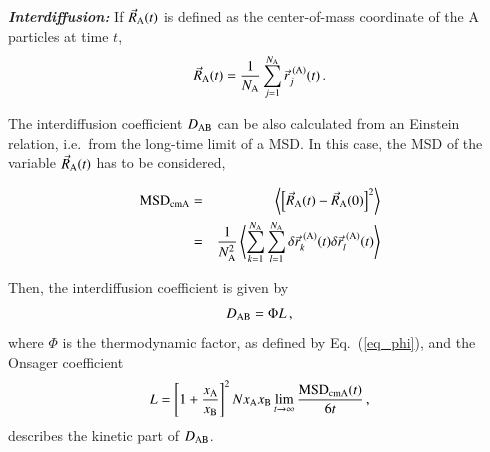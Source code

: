     {\bf \em Interdiffusion:} If $\vec{R}_{\rm A}(t)$ is defined as the center-of-mass coordinate of the A particles at time $t$,
    \begin{equation}
    { \vec{R}_{\rm A}(t) = \frac{1}{N_{\rm A}} \sum_{j=1}^{N_{\rm A}} \vec{r}_j^{\rm \; (A)}(t)} \, .
    \end{equation}

    The interdiffusion coefficient $D_{\rm AB}$ can be also calculated from an Einstein relation, i.e.~from the long-time limit of a MSD. In this case, the MSD of the variable $\vec{R}_{\rm A}(t)$ has to be considered,

    \begin{eqnarray}
    {\rm MSD}_{\rm cmA} 
    & = & \left\langle \left[ \vec{R}_{\rm A}(t) - \vec{R}_{\rm A}(0) \right]^2 \right\rangle \nonumber \\
    & = & \frac{1}{N_{\rm A}^2} \left\langle \sum_{k = 1}^{N_{\rm A}} \sum_{l = 1}^{N_{\rm A}} \delta \vec{r}_k^{\rm \; (A)}(t) \delta \vec{r}_l^{\rm \; (A)}(t) \right\rangle 
    \label{eq_msdcm}
    \end{eqnarray}

    Then, the interdiffusion coefficient is given by \cite{horbach2007}
    \begin{equation}
    D_{\rm AB} = \Phi L \, ,
    \label{eq_dab}
    \end{equation}
    where $\Phi$ is the thermodynamic factor, as defined by Eq.~(\ref{eq_phi}), and the Onsager coefficient
    \begin{equation}
    { L = \left[ 1+ \frac{x_{\rm A}}{x_{\rm B}} \right]^2 N x_{\rm A} x_{\rm B} \lim_{t\to \infty} \frac{{\rm MSD}_{\rm cmA}(t)}{6t}} \, ,
    \label{eq_onsager}
    \end{equation}
    describes the kinetic part of $D_{\rm AB}$. 

